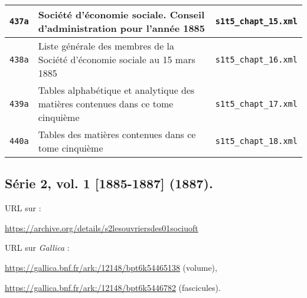 \begin{center}
\begin{longtable}{ | c | p{9.5cm} | c | }
\texttt{437a} & Société d'économie sociale. Conseil d'administration pour l'année 1885 & \texttt{s1t5\_chapt\_15.xml} \\ \hline
\texttt{438a} &  Liste générale des membres de la Société d'économie sociale au 15 mars 1885 & \texttt{s1t5\_chapt\_16.xml} \\ \hline
\texttt{439a} & Tables alphabétique et analytique des matières contenues dans ce tome cinquième & \texttt{s1t5\_chapt\_17.xml} \\ \hline
\texttt{440a} & Tables des matières contenues dans ce tome cinquième & \texttt{s1t5\_chapt\_18.xml} \\ \hline
\end{longtable}
\end{center}

\newpage

\subsection{Série 2, vol. 1 [1885-1887] (1887).}
\label{mappings2t1}

URL sur \ia{} : 

\url{https://archive.org/details/s2lesouvriersdes01sociuoft}

URL sur \textit{Gallica} : 

\url{https://gallica.bnf.fr/ark:/12148/bpt6k54465138} (volume),

\url{https://gallica.bnf.fr/ark:/12148/bpt6k5446782} (fascicules).

